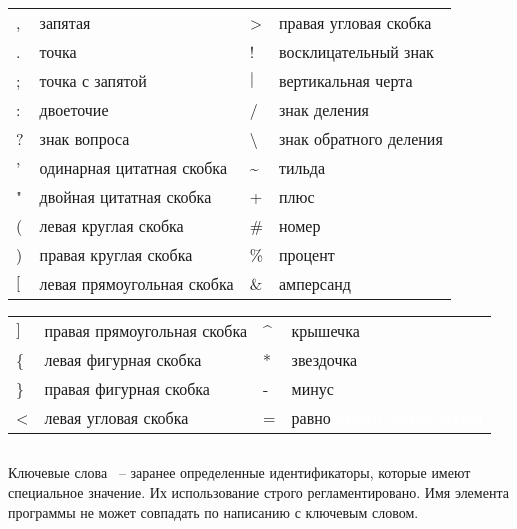 \renewcommand{\arraystretch}{1.2} %
\renewcommand{\tabcolsep}{0.2cm}   %
\begin{center}
\begin{tabular}{ l l|l l }
, &  запятая  &  >  &  правая угловая скобка   \\
. &  точка &   ! &   восклицательный знак   \\
; &  точка с запятой  &   $\vert$   &  вертикальная черта      \\
: &  двоеточие  &   /   &  знак деления   \\
? &  знак вопроса     &  \textbackslash   &  знак обратного деления    \\
' &  одинарная цитатная скобка     &  \textasciitilde  &  тильда    \\
" &  двойная цитатная скобка     &  +   &  плюс    \\
( & левая круглая скобка     &   \#   &  номер   \\
) &  правая круглая скобка    &   \%    &  процент \\
$ [ $ &  левая прямоугольная скобка     &  \&   &  амперсанд\\
\end{tabular}
\end{center}

\begin{center}
\begin{tabular}{ l l|l l }
$ ] $ &  правая прямоугольная скобка     &   \textasciicircum   &  крышечка\\
\{ &  левая фигурная скобка     &   *    &  звездочка\\
\} &  правая фигурная скобка     &   -   &  минус\\
< &  левая угловая скобка    &   =   &  равно \textcolor{white}{отступ отступ отступ} \\
\end{tabular}
\end{center}

\subsection{}

Ключевые слова ~-- заранее определенные идентификаторы, которые имеют специальное значение. Их использование строго регламентировано. Имя элемента программы не может совпадать по написанию с ключевым словом. 

